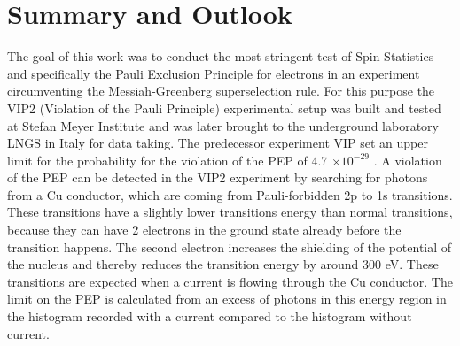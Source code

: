 \chapter{Summary and Outlook}
\label{chap:Conclusion}

The goal of this work was to conduct the most stringent test of Spin-Statistics and specifically the Pauli Exclusion Principle for electrons in an experiment circumventing the Messiah-Greenberg superselection rule. For this purpose the VIP2 (Violation of the Pauli Principle) experimental setup was built and tested at Stefan Meyer Institute and was later brought to the underground laboratory LNGS in Italy for data taking. The predecessor experiment VIP set an upper limit for the probability for the violation of the PEP of 4.7 $\times 10^{-29}$ \cite{Curceanu2011}. A violation of the PEP can be detected in the VIP2 experiment by searching for photons from a Cu conductor, which are coming from Pauli-forbidden 2p to 1s transitions. These transitions have a slightly lower transitions energy than normal transitions, because they can have 2 electrons in the ground state already before the transition happens. The second electron increases the shielding of the potential of the nucleus and thereby reduces the transition energy by around 300 eV. These transitions are expected when a current is flowing through the Cu conductor. The limit on the PEP is calculated from an excess of photons in this energy region in the histogram recorded with a current compared to the histogram without current.

